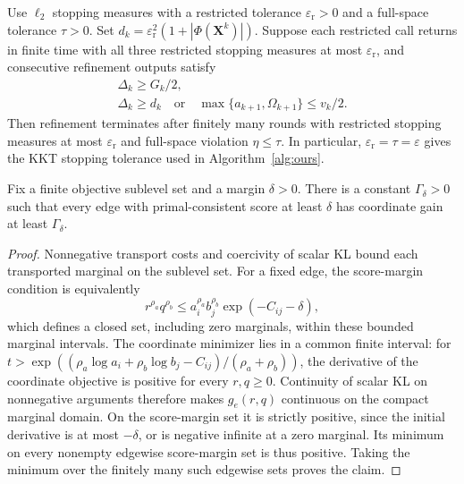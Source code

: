 \begin{theorem}
\label{thm:refinement-explicit}
Use $\ell_2$ stopping measures with a restricted tolerance $\varepsilon_{\mathrm r}>0$ and a full-space tolerance $\tau>0$.
Set $d_k=\varepsilon_{\mathrm r}^2(1+|\Phi(\mathbf X^k)|)$.
Suppose each restricted call returns in finite time with all three restricted stopping measures at most $\varepsilon_{\mathrm r}$, and consecutive refinement outputs satisfy
\begin{equation}
\label{eq:refinement-output-conditions}
\begin{gathered}
\Delta_k\geq G_k/2,\\
\Delta_k\geq d_k
\quad\text{or}\quad
\max\{a_{k+1},\Omega_{k+1}\}\leq v_k/2.
\end{gathered}
\end{equation}
Then refinement terminates after finitely many rounds with restricted stopping measures at most $\varepsilon_{\mathrm r}$ and full-space violation $\eta\leq\tau$.
In particular, $\varepsilon_{\mathrm r}=\tau=\varepsilon$ gives the KKT stopping tolerance used in Algorithm~\ref{alg:ours}.
\end{theorem}

\begin{lemma}
\label{lem:refinement-uniform-gain}
Fix a finite objective sublevel set and a margin $\delta>0$.
There is a constant $\Gamma_\delta>0$ such that every edge with primal-consistent score at least $\delta$ has coordinate gain at least $\Gamma_\delta$.
\end{lemma}

\begin{proof}
Nonnegative transport costs and coercivity of scalar KL bound each transported marginal on the sublevel set.
For a fixed edge, the score-margin condition is equivalently
\begin{equation*}
r^{\rho_a}q^{\rho_b}\leq a_i^{\rho_a}b_j^{\rho_b}\exp(-C_{ij}-\delta),
\end{equation*}
which defines a closed set, including zero marginals, within these bounded marginal intervals.
The coordinate minimizer lies in a common finite interval: for $t>\exp((\rho_a\log a_i+\rho_b\log b_j-C_{ij})/(\rho_a+\rho_b))$, the derivative of the coordinate objective is positive for every $r,q\geq0$.
Continuity of scalar KL on nonnegative arguments therefore makes $g_e(r,q)$ continuous on the compact marginal domain.
On the score-margin set it is strictly positive, since the initial derivative is at most $-\delta$, or is negative infinite at a zero marginal.
Its minimum on every nonempty edgewise score-margin set is thus positive.
Taking the minimum over the finitely many such edgewise sets proves the claim.
\end{proof}

